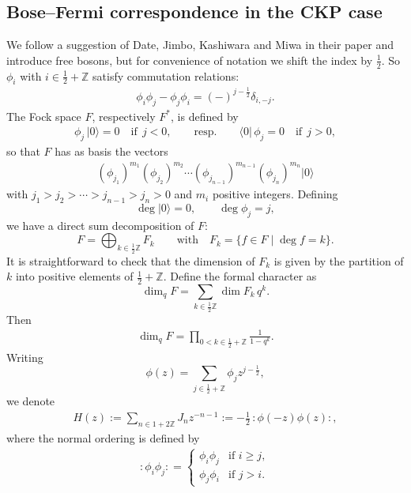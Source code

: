 \documentclass[11pt]{article}
\numberwithin{equation}{section}
\newcommand{\INZ}[2]{\in\frac#1#2 +\mathbb{Z}}
\begin{document}
\subsection[Bose-Fermi correspondence in the CKP case]{Bose--Fermi correspondence in the CKP case}\label{Bose-Fermi}

We follow a suggestion of Date, Jimbo, Kashiwara and Miwa in their paper \cite{DJKMVI}
and introduce free bosons, but for convenience of notation we
shift the index by $\frac 12$. So
$\phi_i$ with $i\in\frac 12+\mathbb{Z}$ satisfy commutation relations:
\begin{gather}
\label{S1}
\phi_{i}\phi_j-\phi_j\phi_i=(-)^{j-\frac{1}{2}}\delta_{i,-j}.
\end{gather}
The Fock space $F$, respectively $F^*$, is def\/ined
by
\begin{gather}
\label{S2} \phi_j\, |0\rangle=0\quad\mbox{if}\ \ j<0,\qquad\mbox{resp.}\qquad
\langle 0|\, \phi_j=0\quad\mbox{if}\ \ j>0,
\end{gather}
so that $F$ has as basis the vectors
 \begin{gather}\label{S2BASIS}
(\phi_{j_1})^{m_1}(\phi_{j_{2}})^{m_{2}}
\cdots(\phi_{j_{n-1}})^{m_{n-1}}(\phi_{j_n})^{m_n}|0\rangle
 \end{gather}
with $j_1>j_2>\cdots> j_{n-1}>j_n>0$ and $m_i$ positive integers.
Def\/ining
\[
\deg |0\rangle =0 ,\qquad\deg\phi_j=j ,
\]
we have a direct sum decomposition of $F$:
\[
F=\bigoplus_{k\in\frac12\mathbb Z} F_k\qquad\mbox{with}\quad
F_k=\{f\in F\mid \deg f=k\} .
\]
It is straightforward to check that the dimension of $F_k$ is
given by the partition of $k$ into
 positive elements of $\frac 12+\mathbb{Z}$.
Def\/ine the formal character as
\[
\dim_q F=\sum_{k\in\frac12\mathbb Z} \dim F_k\, q^k .
\]
Then
\begin{gather}\label{q1}
\dim_q F=\prod_{0<k\INZ12}\frac 1{1-q^k} .
\end{gather}
Writing
\[
\phi(z)=\sum_{j\INZ12}\phi_jz^{j-\frac 12} ,
\]
we denote
\begin{gather}
\label{S4} H(z):=\sum_{n\in
1+2\mathbb{Z}}J_nz^{-n-1}:=-\frac 12\,{:}\phi(-z)\phi(z){:} ,
\end{gather}
where the normal ordering is def\/ined by
\begin{gather}\label{normal ordering}
{:}\phi_i\phi_j{:}=
\begin{cases}
\phi_i\phi_j&\mbox{if }i\ge j ,\\[2pt]
\phi_j\phi_i&\mbox{if }j>i .
\end{cases}
\end{gather}
\end{document}
